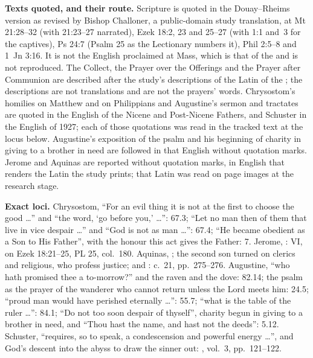 {\textbf{Texts quoted, and their route.} Scripture is quoted in the
Douay--Rheims version as revised by Bishop Challoner, a public-domain study
translation, at Mt 21:28--32 (with 21:23--27 narrated), Ezek 18:2, 23 and
25--27 (with 1:1 and~3 for the captives), Ps 24:7 (Psalm 25 as the
Lectionary numbers it), Phil 2:5--8 and 1~Jn 3:16. It is not the English
proclaimed at Mass, which is that of the  and is not reproduced. The
Collect, the Prayer over the Offerings and the Prayer after Communion are
described after the study's descriptions of the Latin of the ; the descriptions are not translations and are not the prayers'
words. Chrysostom's homilies on Matthew and on Philippians and Augustine's
sermon and tractates are quoted in the English of the Nicene and Post-Nicene
Fathers, and Schuster in the English of 1927; each of those quotations was
read in the tracked text at the locus below. Augustine's exposition of the
psalm and his beginning of charity in giving to a brother in need are followed
in that English without quotation marks. Jerome and Aquinas are reported
without quotation marks, in English that renders the Latin the study prints;
that Latin was read on page images at the research stage.

\textbf{Exact loci.} Chrysostom, ``For an evil thing it is not at the first
to choose the good \ldots'' and ``the word, `go before you,' \ldots'':
 67.3; ``Let no man then of them that live in vice
despair \ldots'' and ``God is not as man \ldots'': 67.4; ``He became obedient
as a Son to His Father'', with the honour this act gives the Father:
 7. Jerome, :  VI, on Ezek
18:21--25, PL 25, col.~180. Aquinas, ; the second son turned on clerics and religious, who profess
justice; and :  c.~21, pp.~275--276. Augustine, ``who hath
promised thee a to-morrow?'' and the raven and the dove:  82.14;
the psalm as the prayer of the wanderer who cannot return unless the Lord
meets him:  24.5; ``proud man would have
perished eternally \ldots'':  55.7; ``what is the
table of the ruler \ldots'': 84.1; ``Do not too soon despair of thyself'',
charity begun in giving to a brother in need, and ``Thou hast the name, and
hast not the deeds'':  5.12.
Schuster, ``requires, so to speak, a condescension and powerful energy
\ldots'', and God's descent into the abyss to draw the sinner out: , vol.~3, pp.~121--122.

\par}

